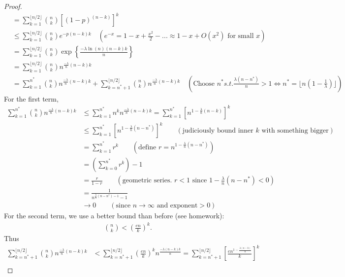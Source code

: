 \documentclass[./some_latex_template.tex]{subfiles}
\begin{document}
\begin{proof}
\begin{align*}
	&= \sum_{k=1}^{\lfloor n/2 \rfloor} {n \choose k} \left[ (1-p)^{(n - k)} \right]^k\\
	&\le \sum_{k=1}^{\lfloor n/2 \rfloor} {n \choose k} e^{-p(n-k)k} \quad \left(e^{-x} = 1 - x + \frac{x^2}{2} - ... \approx 1 - x + O(x^2) \text{ for small }x\right)\\
	&= \sum_{k=1}^{\lfloor n/2 \rfloor} {n \choose k} \exp\left\{\frac{-\lambda \ln(n)(n-k)k}{n}\right\}\\
	&= \sum_{k=1}^{\lfloor n/2 \rfloor} {n \choose k} n^{\frac{-\lambda}{n}(n-k)k}\\
	&= \sum_{k=1}^{n^*} {n \choose k} n^{\frac{-\lambda}{n}(n-k)k} + \sum_{k=n^* + 1}^{\lfloor n/2 \rfloor} {n \choose k} n^{\frac{-\lambda}{n}(n-k)k} \quad \left(\text{Choose } n^* s.t. \frac{\lambda(n - n^*)}{n}>1 \iff n^* = \lfloor n(1 - \frac{1}{\lambda}) \rfloor\right)
\end{align*}
For the first term, 
\begin{align*}
	\sum_{k=1}^{n^*} {n \choose k} n^{\frac{-\lambda}{n}(n-k)k}
	&\le \sum_{k=1}^{n^*} n^k n^{\frac{-\lambda}{n}(n-k)k} = \sum_{k=1}^{n^*} \left[ n^{1 - \frac{\lambda}{n}(n-k)} \right]^k\\
	&\le \sum_{k=1}^{n^*} \left[ n^{1 - \frac{\lambda}{n}(n-n^*)} \right]^k \qquad \left(\text{judiciously bound inner } k \text{ with something bigger}\right)\\
	&= \sum_{k=1}^{n^*} r^k \qquad \left(\text{define } r = n^{1 - \frac{\lambda}{n}(n-n^*)}\right)\\
	&= \left(\sum_{k=0}^{n^*} r^k\right) - 1\\
	&= \frac{r}{1-r} \qquad \left(\text{geometric series. } r < 1 \text{ since } 1 - \frac{\lambda}{n}(n-n^*) < 0\right)\\
	&= \frac{1}{n^{\frac{\lambda}{n}(n-n^*) - 1} - 1}\\
	&\longrightarrow 0 \qquad \left(\text{since } n \rightarrow \infty \text{ and exponent} > 0\right)
\end{align*}
For the second term, we use a better bound than before (see homework):
\begin{align*}
	{n \choose k} < \left(\frac{en}{k}\right)^k.
\end{align*}
Thus 
\begin{align*}
	\sum_{k=n^* + 1}^{\lfloor n/2 \rfloor} {n \choose k} n^{\frac{-\lambda}{n}(n-k)k} 
	&< \sum_{k=n^* + 1}^{\lfloor n/2 \rfloor} \left(\frac{en}{k}\right)^k n^{\frac{-\lambda(n-k)k}{n}} = \sum_{k=n^* + 1}^{\lfloor n/2 \rfloor} \left[ \frac{en^{1 - \frac{\lambda(n-k)}{n}}}{k}\right]^k\\

\end{align*}
\end{proof}
\end{document}
